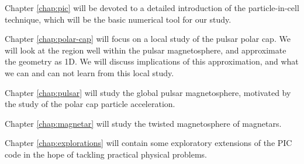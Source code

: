 Chapter \ref{chap:pic} will be devoted to a detailed introduction of the
particle-in-cell technique, which will be the basic numerical tool for our
study.

Chapter \ref{chap:polar-cap} will focus on a local study of the pulsar
polar cap. We will look at the region well within the pulsar magnetosphere, and
approximate the geometry as 1D. We will discuss implications of this
approximation, and what we can and can not learn from this local study.

Chapter \ref{chap:pulsar} will study the global pulsar magnetosphere, motivated
by the study of the polar cap particle acceleration.

Chapter \ref{chap:magnetar} will study the twisted magnetosphere of magnetars.

Chapter \ref{chap:explorations} will contain some exploratory extensions of the
PIC code in the hope of tackling practical physical problems.

